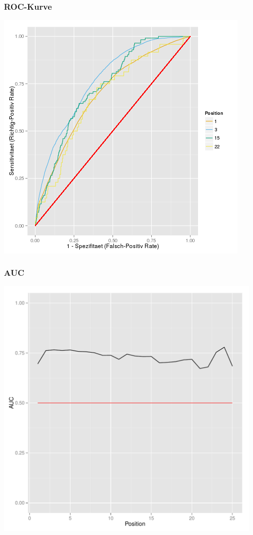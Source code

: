 \begin{frame}\frametitle{ROC-Kurve}
	\centering\includegraphics[scale=0.3]{roc.png}
\end{frame}

\begin{frame}\frametitle{AUC}
	\centering\includegraphics[scale=0.3]{auc.pdf}
\end{frame}

